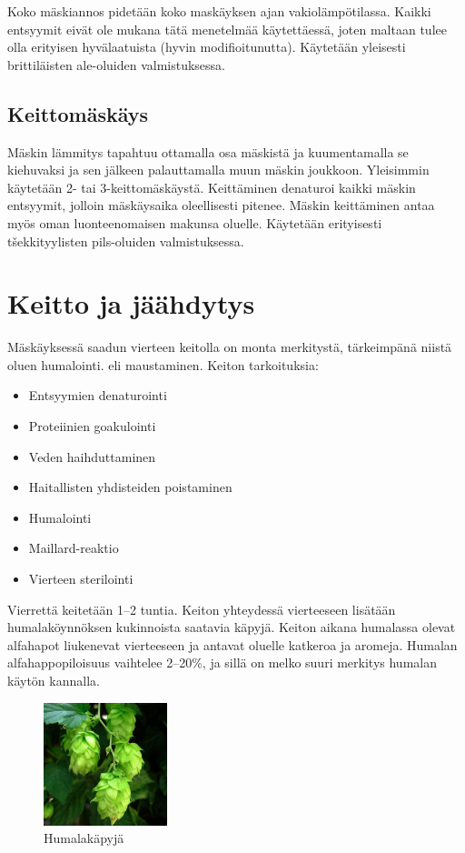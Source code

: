 \documentclass[a4paper,11pt]{report}
\begin{document}
Koko mäskiannos pidetään koko maskäyksen ajan vakiolämpötilassa. Kaikki entsyymit eivät ole mukana tätä menetelmää käytettäessä, joten maltaan tulee olla erityisen hyvälaatuista (hyvin modifioitunutta). Käytetään yleisesti brittiläisten ale-oluiden valmistuksessa.

\subsection{Keittomäskäys}

Mäskin lämmitys tapahtuu ottamalla osa mäskistä ja kuumentamalla se kiehuvaksi ja sen jälkeen palauttamalla muun mäskin joukkoon. Yleisimmin käytetään 2- tai 3-keittomäskäystä. Keittäminen denaturoi kaikki mäskin entsyymit, jolloin mäskäysaika oleellisesti pitenee. Mäskin keittäminen antaa myös oman luonteenomaisen makunsa oluelle. Käytetään erityisesti tšekkityylisten pils-oluiden valmistuksessa.

\section{Keitto ja jäähdytys}

Mäskäyksessä saadun vierteen keitolla on monta merkitystä, tärkeimpänä niistä oluen humalointi. eli maustaminen. Keiton tarkoituksia:
\begin{itemize}
\item Entsyymien denaturointi
\item Proteiinien goakulointi
\item Veden haihduttaminen
\item Haitallisten yhdisteiden poistaminen
\item Humalointi
\item Maillard-reaktio
\item Vierteen sterilointi
\end{itemize}

Vierrettä keitetään 1--2 tuntia. Keiton yhteydessä vierteeseen lisätään humalaköynnöksen kukinnoista saatavia käpyjä. Keiton aikana humalassa olevat alfahapot liukenevat vierteeseen ja antavat oluelle katkeroa ja aromeja. Humalan alfahappopiloisuus vaihtelee 2--20\%, ja sillä on melko suuri merkitys humalan käytön kannalla.

\begin{figure}
  \begin{center}
    \includegraphics[width=0.32\textwidth]{hops}
    \caption{Humalakäpyjä}
  \end{center}
  \end{figure}
\end{document}
